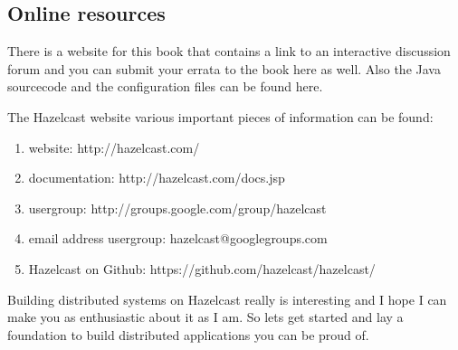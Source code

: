 \subsection*{Online resources}

There is a website for this book that contains a link to an interactive discussion forum and you can submit your errata to the book here as well. Also the Java sourcecode and the configuration files can be found here. 

The Hazelcast website various important pieces of information can be found:
\begin{enumerate}
\item website: http://hazelcast.com/
\item documentation: http://hazelcast.com/docs.jsp
\item usergroup: http://groups.google.com/group/hazelcast
\item email address usergroup: hazelcast@googlegroups.com
\item Hazelcast on Github: https://github.com/hazelcast/hazelcast/
\end{enumerate}

Building distributed systems on Hazelcast really is interesting and I hope I can make you as enthusiastic about it as I am. So lets get started and lay a foundation to build distributed applications you can be proud of.
